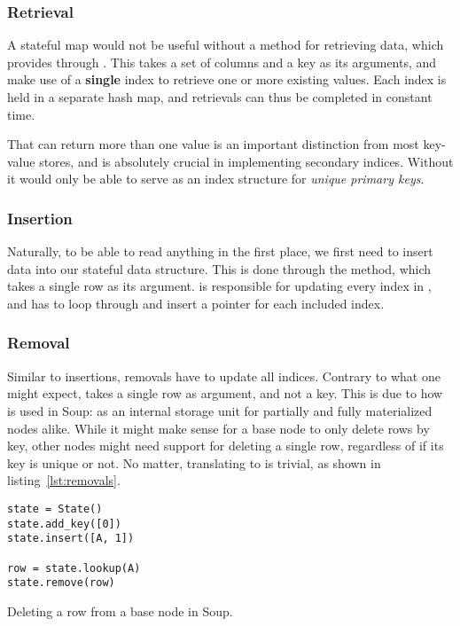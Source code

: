 \subsubsection{Retrieval}

A stateful map would not be useful without a method for retrieving data, which
 provides through . This takes a set of columns
and a key as its arguments, and make use of a \textbf{single} index to retrieve
one or more existing values. Each index is held in a separate hash map, and
retrievals can thus be completed in constant time.

That  can return more than one value is an important
distinction from most key-value stores, and is absolutely crucial in
implementing secondary indices. Without it  would only be able to
serve as an index structure for \textit{unique primary keys}.

\subsubsection{Insertion}

Naturally, to be able to read anything in the first place, we first need to
insert data into our stateful data structure. This is done through the
 method, which takes a single row as its argument.
 is responsible for updating every index in ,
and has to loop through and insert a pointer for each included index.

\subsubsection{Removal}

Similar to insertions, removals have to update all indices. Contrary to what one
might expect,  takes a single row as argument, and not a
key. This is due to how  is used in Soup: as an internal storage
unit for partially and fully materialized nodes alike. While it might make sense
for a base node to only delete rows by key, other nodes might need support for
deleting a single row, regardless of if its key is unique or not. No matter,
translating  to  is trivial, as shown in
listing~\ref{lst:removals}.

\begin{listing}[H]
  \begin{verbatim}
state = State()
state.add_key([0])
state.insert([A, 1])

row = state.lookup(A)
state.remove(row)
  \end{verbatim}

  \caption{Deleting a row from a base node in Soup.}\label{lst:removals}
\end{listing}

